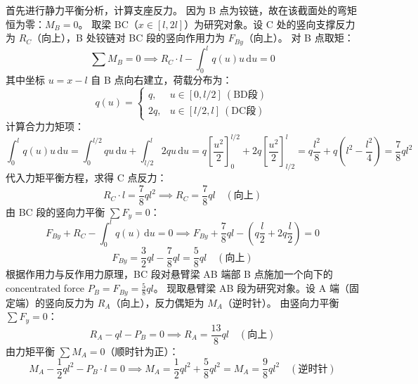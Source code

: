 \documentclass[UTF8,fontset=windows]{ctexart}
\newcommand{\diff}{\,\mathrm{d}}
\begin{document}
首先进行静力平衡分析，计算支座反力。
因为 B 点为铰链，故在该截面处的弯矩恒为零：$M_B = 0$。
取梁 BC（$x \in [l, 2l]$）为研究对象。设 C 处的竖向支撑反力为 $R_C$（向上），B 处铰链对 BC 段的竖向作用力为 $F_{By}$（向上）。
对 B 点取矩：
\[
    \sum M_B = 0 \implies R_C \cdot l - \int_{0}^{l} q(u) u \diff u = 0
\]
其中坐标 $u = x - l$ 自 B 点向右建立，荷载分布为：
\[
    q(u) = \begin{cases} q, & u \in [0, l/2] \ (\text{BD段}) \\ 2q, & u \in [l/2, l] \ (\text{DC段}) \end{cases}
\]
计算合力力矩项：
\[
    \int_{0}^{l} q(u) u \diff u = \int_{0}^{l/2} q u \diff u + \int_{l/2}^{l} 2q u \diff u
    = q \left[ \frac{u^2}{2} \right]_{0}^{l/2} + 2q \left[ \frac{u^2}{2} \right]_{l/2}^{l}
    = q \frac{l^2}{8} + q \left( l^2 - \frac{l^2}{4} \right) = \frac{7}{8} ql^2
\]
代入力矩平衡方程，求得 C 点反力：
\[
    R_C \cdot l = \frac{7}{8} ql^2 \implies R_C = \frac{7}{8} ql \quad (\text{向上})
\]
由 BC 段的竖向力平衡 $\sum F_y = 0$：
\[
    F_{By} + R_C - \int_{0}^{l} q(u) \diff u = 0 \implies F_{By} + \frac{7}{8} ql - \left( q \frac{l}{2} + 2q \frac{l}{2} \right) = 0
\]
\[
    F_{By} = \frac{3}{2} ql - \frac{7}{8} ql = \frac{5}{8} ql \quad (\text{向上})
\]
根据作用力与反作用力原理，BC 段对悬臂梁 AB 端部 B 点施加一个向下的 concentrated force $P_B = F_{By} = \frac{5}{8} ql$。
现取悬臂梁 AB 段为研究对象。设 A 端（固定端）的竖向反力为 $R_A$（向上），反力偶矩为 $M_A$（逆时针）。
由竖向力平衡 $\sum F_y = 0$：
\[
    R_A - ql - P_B = 0 \implies R_A = \frac{13}{8} ql \quad (\text{向上})
\]
由力矩平衡 $\sum M_A = 0$（顺时针为正）：
\[
    M_A - \frac{1}{2} ql^2 - P_B \cdot l = 0 \implies M_A = \frac{1}{2} ql^2 + \frac{5}{8} ql^2 = M_A = \frac{9}{8} ql^2 \quad (\text{逆时针})
\]
\end{document}
